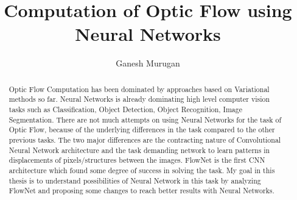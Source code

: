 \documentclass[12pt]{report}
\title{Computation of Optic Flow using Neural Networks}
\author{Ganesh Murugan}
\begin{document}
\maketitle

\begin{abstract}
	Optic Flow Computation has been dominated by approaches based on Variational methods so far. Neural Networks is already dominating high level computer vision tasks such as Classification, Object Detection, Object Recognition, Image Segmentation. There are not much attempts on using Neural Networks for the task of Optic Flow, because of the underlying differences in the task compared to the other previous tasks. The two major differences are the contracting nature of Convolutional Neural Network architecture  and the task demanding network to learn patterns in displacements of pixels/structures between the images. FlowNet is the first CNN architecture which found some degree of success in solving the task. My goal in this thesis is to understand possibilities of Neural Network in this task by analyzing FlowNet and proposing some changes to reach better results with Neural Networks. 
\end{abstract}
\end{document}

